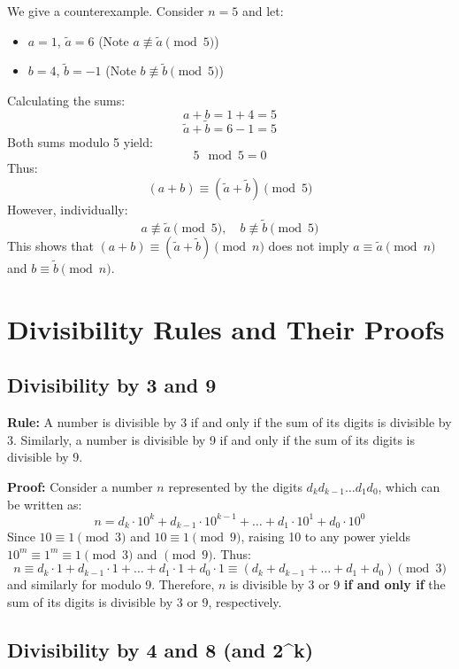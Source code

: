 \documentclass{article}
\begin{document}
We give a counterexample. Consider \( n = 5 \) and let:
\begin{itemize}
    \item \( a = 1 \), \( \tilde{a} = 6 \) (Note \( a \not\equiv \tilde{a} \pmod{5} \))
    \item \( b = 4 \), \( \tilde{b} = -1 \) (Note \( b \not\equiv \tilde{b} \pmod{5} \))
\end{itemize}

Calculating the sums:
\[
a + b = 1 + 4 = 5
\]
\[
\tilde{a} + \tilde{b} = 6 - 1 = 5
\]
Both sums modulo 5 yield:
\[
5 \mod 5 = 0
\]
Thus:
\[
(a + b) \equiv (\tilde{a} + \tilde{b}) \pmod{5}
\]
However, individually:
\[
a \not\equiv \tilde{a} \pmod{5}, \quad b \not\equiv \tilde{b} \pmod{5}
\]
This shows that \( (a + b) \equiv (\tilde{a} + \tilde{b}) \pmod{n} \) does not imply \( a \equiv \tilde{a} \pmod{n} \) and \( b \equiv \tilde{b} \pmod{n} \).

\section*{Divisibility Rules and Their Proofs}

\subsection*{Divisibility by 3 and 9}

\textbf{Rule:} A number is divisible by 3 if and only if the sum of its digits is divisible by 3. Similarly, a number is divisible by 9 if and only if the sum of its digits is divisible by 9.

\textbf{Proof:}
Consider a number \( n \) represented by the digits \( d_kd_{k-1}\ldots d_1d_0 \), which can be written as:
\[ n = d_k \cdot 10^k + d_{k-1} \cdot 10^{k-1} + \ldots + d_1 \cdot 10^1 + d_0 \cdot 10^0 \]
Since \( 10 \equiv 1 \pmod{3} \) and \( 10 \equiv 1 \pmod{9} \), raising 10 to any power yields \( 10^m \equiv 1^m \equiv 1 \pmod{3} \) and \( \pmod{9} \). Thus:
\[ n \equiv d_k \cdot 1 + d_{k-1} \cdot 1 + \ldots + d_1 \cdot 1 + d_0 \cdot 1 \equiv (d_k + d_{k-1} + \ldots + d_1 + d_0) \pmod{3} \]
and similarly for modulo 9. Therefore, \( n \) is divisible by 3 or 9 \textbf{if and only if} the sum of its digits is divisible by 3 or 9, respectively.

\subsection*{Divisibility by 4 and 8 (and 2^{k})}
\end{document}
